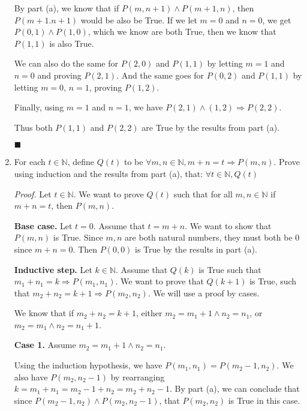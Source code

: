 \documentclass{article}
\newcommand\qedsymbol{\hfill$\blacksquare$}
\begin{document}
\begin{enumerate}[label = (\alph*)]
        By part (a), we know 
        that if $P(m, n+1) \land P(m+1, n)$, then $ P (m +1. n+1)$ would 
        be also be True. If we let $m = 0$ and $n = 0$, we get 
        $P (0, 1) \land P (1, 0)$, which we know are both True, then we know 
        that $P (1, 1)$ is also True. 

        We can also do the same for 
        $P (2, 0)$ and $P (1, 1)$ by letting $m = 1$ and $n = 0$ and proving 
        $P (2, 1)$. And the same goes for $P (0, 2)$ and $P (1, 1)$ by 
        letting $m = 0$, $n = 1$, proving $P(1, 2)$. 

        Finally, using $m = 1$ and $n = 1$, we have $ P (2, 1) 
        \land (1, 2) \Rightarrow P(2, 2)$. 

        Thus both $P (1, 1)$ and $P (2, 2)$ are True by the results 
        from part (a).

        \qedsymbol

    \item For each $t \in \mathbb{N}$, define $Q (t)$ to be $\forall m, n 
        \in \mathbb{N}, m + n = t \Rightarrow P (m ,n)$. Prove using induction 
        and the results from part (a), that: $\forall t \in \mathbb{N}, 
        Q(t)$ 

        \textit{Proof.} Let $t \in \mathbb{N}$. We want to prove $Q (t)$
        such that for all $m, n \in \mathbb{N}$ if $m + n = t$, then 
        $P (m, n)$. 

        \textbf{Base case.} Let $t = 0$. Assume that $t = m + n$. We want 
        to show that $P(m, n)$ is True. Since $m, n$ are both natural 
        numbers, they must both be 0 since $m + n = 0$. Then $P (0, 0)$ 
        is True by the results in part (a).

        \textbf{Inductive step.} Let $k \in \mathbb{N}$. Assume that 
        $Q (k)$ is True such that $m_1 + n_1 = k \Rightarrow P(m_1, n_1)$. We 
        want to prove that $Q (k+1)$ is True, such that $m_2 + n_2 = 
        k + 1 \Rightarrow P (m_2, n_2)$. We will use a proof by cases.

        We know that if $m_2 + n_2 = k + 1$, either $m_2 = m_1 + 1 \land 
        n_2 = n_1$, or $m_2 = m_1 \land n_2 = n_1 + 1$. 
        
        \textbf{Case 1.} Assume $m_2 = m_1 + 1 \land n_2 = n_1$. 

        Using the induction hypothesis, we have $P (m_1, n_1) = P (m_2 - 1, 
        n_2)$. We also have $P (m_2, n_2 - 1)$ by rearranging 
        $k = m_1 + n_1 = m_2 - 1 + n_2 = m_2 + n_2 - 1$. By part (a), 
        we can conclude that since $ P (m_2 -1 , n_2) \land P (m_2, n_2 -1)$, 
        that $P (m_2, n_2)$ is True in this case.


\end{enumerate}
\end{document}
